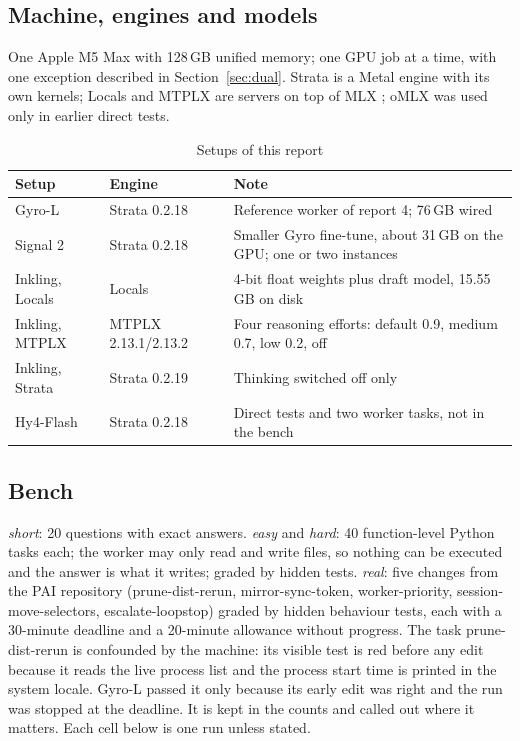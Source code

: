 \subsection{Machine, engines and models}

One Apple M5 Max with 128\,GB unified memory; one GPU job at a time, with one exception described in
Section~\ref{sec:dual}. Strata is a Metal engine with its own kernels; Locals \citep{Locals-2026aa} and MTPLX
\citep{MTPLX-2026aa} are servers on top of MLX \citep{MLX-2026aa}; oMLX was used only in earlier direct tests.

\begin{table}[H]
\centering
\small
\caption{Setups of this report}\label{tab:setups}
\begin{tabular}{P{3.7cm}P{2.9cm}P{7.0cm}}
\toprule
Setup & Engine & Note \\
\midrule
Gyro-L & Strata 0.2.18 & Reference worker of report 4; 76\,GB wired \\
Signal 2 & Strata 0.2.18 & Smaller Gyro fine-tune, about 31\,GB on the GPU; one or two instances \\
Inkling, Locals & Locals & 4-bit float weights plus draft model, 15.55\,GB on disk \\
Inkling, MTPLX & MTPLX 2.13.1/2.13.2 & Four reasoning efforts: default 0.9, medium 0.7, low 0.2, off \\
Inkling, Strata & Strata 0.2.19 & Thinking switched off only \\
Hy4-Flash & Strata 0.2.18 & Direct tests and two worker tasks, not in the bench \\
\bottomrule
\end{tabular}
\end{table}

\subsection{Bench}

\emph{short}: 20 questions with exact answers. \emph{easy} and \emph{hard}: 40 function-level Python tasks each; the
worker may only read and write files, so nothing can be executed and the answer is what it writes; graded by hidden
tests. \emph{real}: five changes from the PAI repository (prune-dist-rerun, mirror-sync-token, worker-priority,
session-move-selectors, escalate-loopstop) graded by hidden behaviour tests, each with a 30-minute deadline and a
20-minute allowance without progress. The task prune-dist-rerun is confounded by the machine: its visible test is
red before any edit because it reads the live process list and the process start time is printed in the system
locale. Gyro-L passed it only because its early edit was right and the run was stopped at the deadline. It is kept in the
counts and called out where it matters. Each cell below is one run unless stated.

